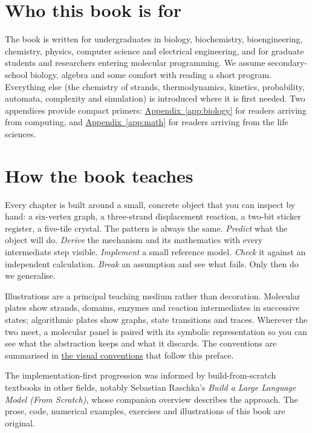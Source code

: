 \section*{Who this book is for}
The book is written for undergraduates in biology, biochemistry,
bioengineering, chemistry, physics, computer science and electrical
engineering, and for graduate students and researchers entering molecular
programming. We assume secondary-school biology, algebra and some comfort with
reading a short program. Everything else (the chemistry of strands,
thermodynamics, kinetics, probability, automata, complexity and simulation) is
introduced where it is first needed. Two appendices provide compact primers:
\hyperref[app:biology]{Appendix~\ref*{app:biology}} for readers arriving from
computing, and \hyperref[app:math]{Appendix~\ref*{app:math}} for readers
arriving from the life sciences.

\section*{How the book teaches}
Every chapter is built around a small, concrete object that you can inspect
by hand: a six-vertex graph, a three-strand displacement reaction, a two-bit
sticker register, a five-tile crystal. The pattern is always the same.
\emph{Predict} what the object will do. \emph{Derive} the mechanism and its
mathematics with every intermediate step visible. \emph{Implement} a small
reference model. \emph{Check} it against an independent calculation.
\emph{Break} an assumption and see what fails. Only then do we generalise.

Illustrations are a principal teaching medium rather than decoration.
Molecular plates show strands, domains, enzymes and reaction intermediates in
successive states; algorithmic plates show graphs, state transitions and traces.
Wherever the two meet, a molecular panel is paired with its symbolic
representation so you can see what the abstraction keeps and what it discards.
The conventions are summarised in \hyperref[sec:conventions]{the visual
conventions} that follow this preface.

The implementation-first progression was informed by build-from-scratch
textbooks in other fields, notably Sebastian Raschka's \emph{Build a Large
Language Model (From Scratch)}, whose companion overview describes the
approach.\cite{RaschkaLLM} The prose, code, numerical examples, exercises and
illustrations of this book are original.

